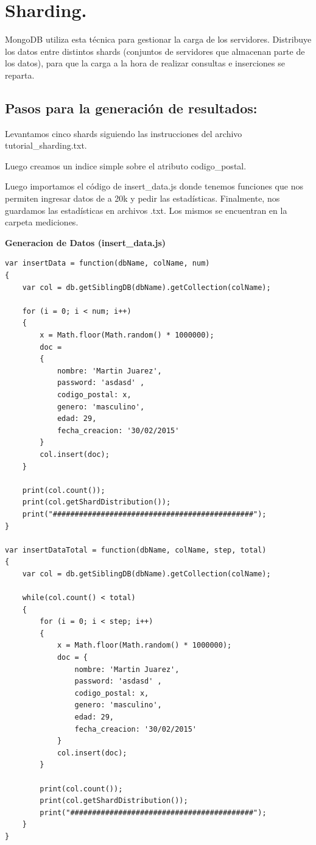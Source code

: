 \section{Sharding.}

MongoDB utiliza esta técnica para gestionar la carga de los servidores. Distribuye los datos entre distintos shards (conjuntos de servidores que almacenan parte de los datos), para que la carga a la hora de realizar consultas e inserciones se reparta.

\subsection{Pasos para la generación de resultados:}

Levantamos cinco shards siguiendo las instrucciones del archivo tutorial\_sharding.txt.

Luego creamos un indice simple sobre el atributo codigo\_postal.

Luego importamos el código de insert\_data.js donde tenemos
funciones que nos permiten ingresar datos de a 20k y pedir las estadísticas.
Finalmente, nos guardamos las estadísticas en archivos .txt. Los mismos se encuentran en
la carpeta mediciones.

\textbf{Generacion de Datos (insert\_data.js)}
\begin{lstlisting}
var insertData = function(dbName, colName, num) 
{
	var col = db.getSiblingDB(dbName).getCollection(colName);
	
	for (i = 0; i < num; i++) 
	{
		x = Math.floor(Math.random() * 1000000);
		doc = 
		{
			nombre: 'Martin Juarez',
			password: 'asdasd' ,
			codigo_postal: x,
			genero: 'masculino',
			edad: 29,
			fecha_creacion: '30/02/2015'
		}
		col.insert(doc);
	}
	
	print(col.count());
	print(col.getShardDistribution());
	print("##############################################");
}

var insertDataTotal = function(dbName, colName, step, total) 
{
	var col = db.getSiblingDB(dbName).getCollection(colName);
	
	while(col.count() < total)
	{
		for (i = 0; i < step; i++) 
		{
			x = Math.floor(Math.random() * 1000000);
			doc = {
				nombre: 'Martin Juarez',
				password: 'asdasd' ,
				codigo_postal: x,
				genero: 'masculino',
				edad: 29,
				fecha_creacion: '30/02/2015'
			}
			col.insert(doc);
		}
		
		print(col.count());
		print(col.getShardDistribution());
		print("##########################################");
	}
}
\end{lstlisting}
